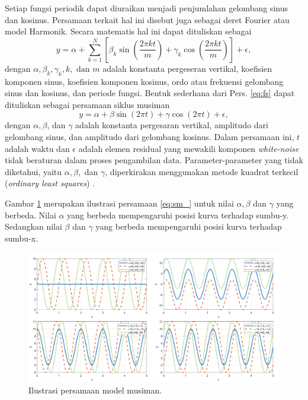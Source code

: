 \begin{spacing}{1.5}
	Setiap fungsi periodik dapat diuraikan menjadi penjumlahan gelombang sinus dan kosinus. Persamaan terkait hal ini disebut juga sebagai deret Fourier atau model Harmonik. Secara matematis hal ini dapat dituliskan sebagai \cite{goela2016time,hyndman2018forecasting} 
	\begin{equation}\label{eq:fs}
		y = \alpha + \sum_{k=1}^{N} \left[ \beta_k \sin(\frac{2\pi kt}{m})+\gamma_k \cos(\frac{2\pi kt}{m})\right]  + \epsilon,
	\end{equation}
	dengan $\alpha, \beta_k, \gamma_k,k,\text{ dan }m$ adalah konstanta pergeseran vertikal, koefisien komponen sinus, koefisien komponen kosinus, ordo atau frekuensi gelombang sinus dan kosinus, dan periode fungsi. Bentuk sederhana dari Pers. \ref{eq:fs} dapat dituliskan sebagai
	persamaan siklus musiman \cite{crawley2012r}
	\begin{equation}\label{eq:sm_}
		y = \alpha + \beta \sin(2\pi t)+\gamma \cos(2\pi t) + \epsilon,
	\end{equation}
	dengan $\alpha, \beta$, dan $\gamma$  adalah konstanta pergesaran vertikal, amplitudo dari gelombang sinus, dan amplitudo dari gelombang kosinus. Dalam persamaan ini, $t$ adalah waktu dan $\epsilon$ adalah elemen residual yang mewakili komponen \textit{white-noise} tidak beraturan dalam proses pengambilan data. Parameter-parameter yang tidak diketahui, yaitu $\alpha, \beta, $ dan $\gamma$, diperkirakan menggunakan metode kuadrat terkecil (\textit{ordinary least squares}) \cite{goela2016time}.
	
	Gambar \ref{fig:sm} merupakan ilustrasi persamaan \ref{eq:sm_} untuk nilai $\alpha,\beta$ dan $\gamma$ yang berbeda. Nilai $\alpha$ yang berbeda mempengaruhi posisi kurva terhadap sumbu-y. Sedangkan nilai $\beta$ dan $\gamma$ yang berbeda mempengaruhi posisi kurva terhadap sumbu-x.
	\begin{figure}[H]
		\centering
		\includegraphics[width=15cm]{contents/Figures/sm_experiment}
		\caption{Ilustrasi persamaan model musiman.}
		\label{fig:sm}
	\end{figure}
	

\end{spacing}
